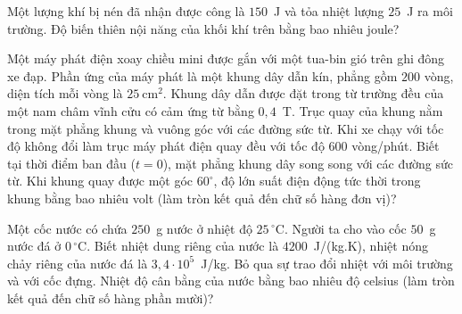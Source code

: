 	\begin{ex}%
		Một lượng khí bị nén đã nhận được công là $150$~J và tỏa nhiệt lượng $25$~J ra môi trường. Độ biến thiên nội năng của khối khí trên bằng bao nhiêu joule?
		\par
	\end{ex}

	\begin{ex}%
		Một máy phát điện xoay chiều mini được gắn với một tua-bin gió trên ghi đông xe đạp. Phần ứng của máy phát là một khung dây dẫn kín, phẳng gồm $200$ vòng, diện tích mỗi vòng là $25~\text{cm}^2$. Khung dây dẫn được đặt trong từ trường đều của một nam châm vĩnh cửu có cảm ứng từ bằng $0{,}4$~T. Trục quay của khung nằm trong mặt phẳng khung và vuông góc với các đường sức từ. Khi xe chạy với tốc độ không đổi làm trục máy phát điện quay đều với tốc độ $600$ vòng/phút. Biết tại thời điểm ban đầu ($t=0$), mặt phẳng khung dây song song với các đường sức từ. Khi khung quay được một góc $60^\circ$, độ lớn suất điện động tức thời trong khung bằng bao nhiêu volt (làm tròn kết quả đến chữ số hàng đơn vị)?
		\par
	\end{ex}

	\begin{ex}%
		Một cốc nước có chứa $250$~g nước ở nhiệt độ $25\,^\circ\text{C}$. Người ta cho vào cốc $50$~g nước đá ở $0\,^\circ\text{C}$. Biết nhiệt dung riêng của nước là $4200$~J/(kg.K), nhiệt nóng chảy riêng của nước đá là $3{,}4\cdot 10^5$~J/kg. Bỏ qua sự trao đổi nhiệt với môi trường và với cốc đựng. Nhiệt độ cân bằng của nước bằng bao nhiêu độ celsius (làm tròn kết quả đến chữ số hàng phần mười)?
		\par
	\end{ex}

